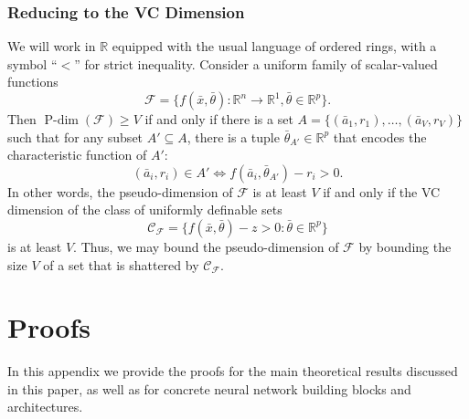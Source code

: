 \documentclass{article}
\theoremstyle{plain}
\theoremstyle{definition}
\theoremstyle{remark}
\newcommand{\reals}{\mathbb{R}}
\newcommand{\calF}{\mathcal{F}}
\newcommand{\calC}{\mathcal{C}}
\DeclareMathOperator{\pdim}{P\text{-}\dim}
\theoremstyle{plain}
\numberwithin{thm}{section}
\theoremstyle{definition}
\numberwithin{equation}{section}
\begin{document}
\subsubsection{Reducing to the VC Dimension}
\label{s:Intro__ss:LearningTheory___sss:VCRedux}
We will work in $\reals$ equipped with the usual language of ordered rings, with a symbol ``$<$'' for strict inequality. 
Consider a uniform family of scalar-valued functions 
\[\calF=\{f(\bar{x},\bar{\theta}):\reals^n\rightarrow\reals ^1, \bar{\theta}\in \reals^p\}.\]
Then $\pdim(\calF)\geq V$ if and only if there is a set $A=\{(\bar{a}_1,r_1),\ldots, (\bar{a}_V,r_V)\}$ such that for any subset $A'\subseteq A$, there is a tuple $\bar{\theta}_{A'}\in \reals^p$ that encodes the characteristic function of $A'$:
\[(\bar{a}_i,r_i)\in A'\Leftrightarrow f(\bar{a}_i,\bar{\theta}_{A'})-r_i>0.\]
In other words, the pseudo-dimension of $\calF$ is at least $V$ if and only if the VC dimension of the class of uniformly definable sets 
\[\calC_\calF=\{f(\bar{x},\bar{\theta})-z>0 : \bar{\theta}\in \reals^p\}\]
is at least $V$. Thus, we may bound the pseudo-dimension of $\calF$ by bounding the size $V$ of a set that is shattered by $\calC_\calF$.










\section{Proofs}
\label{s:Proofs}

In this appendix we provide the proofs for the main theoretical results discussed in this paper, as well as for concrete neural network building blocks and architectures.
\end{document}
